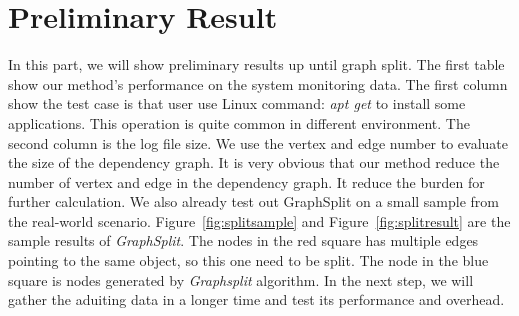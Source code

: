 

\section{Preliminary Result}

In this part, we will show preliminary results up until graph split. The first table show our method's performance on the system monitoring data. The first column show the test case is that user use Linux command: \textit{apt get} to install some applications. This operation is quite common in different environment. The second column is the log file size. We use the vertex and edge number to evaluate the size of the dependency graph. It is very obvious that our method reduce the number of vertex and edge in the dependency graph.  It reduce the burden for further calculation. We also already test out GraphSplit on a small sample from the real-world scenario. Figure~\ref{fig:splitsample} and Figure~\ref{fig:splitresult} are the sample results of \emph{GraphSplit}. The nodes in the red square has multiple edges pointing to the same object, so this one need to be split. The node in the blue square is nodes generated by \emph{Graphsplit} algorithm. In the next step, we will gather the aduiting data in a longer time and test its performance and overhead. 


